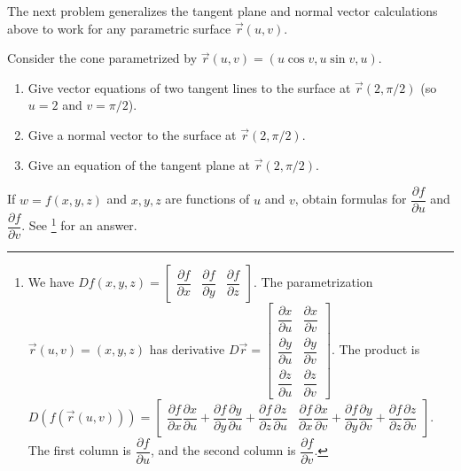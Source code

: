 The next problem generalizes the tangent plane and normal vector calculations above to work for any parametric surface $\vec r(u,v)$.
\begin{problem}[Day 3]%

%
 Consider the cone parametrized by $\vec r(u,v)=(u\cos v, u\sin v,u)$.
 \begin{enumerate}
 \item Give vector equations of two tangent lines to the surface at $\vec r(2,\pi/2)$ (so $u=2$ and $v=\pi/2$).
 \item Give a normal vector to the surface at $\vec r(2,\pi/2)$.
 \item Give an equation of the tangent plane at $\vec r(2,\pi/2)$.
 \end{enumerate}
\end{problem}

\newpage

\begin{review*}[Day 5]
 If $w=f(x,y,z)$ and $x,y,z$ are functions of $u$ and $v$, obtain formulas for $\dfrac{\partial f}{\partial u}$ and $\dfrac{\partial f}{\partial v}$.  See \footnote{
We have 
$Df(x,y,z)
=\begin{bmatrix}\dfrac{\partial f}{\partial x}&\dfrac{\partial f}{\partial y}&\dfrac{\partial f}{\partial z}\end{bmatrix}$. 
The parametrization $\vec r(u,v)=(x,y,z)$ has derivative 
$D\vec r 
=\begin{bmatrix}
\dfrac{\partial x}{\partial u}&\dfrac{\partial x}{\partial v}\\
\dfrac{\partial y}{\partial u}&\dfrac{\partial y}{\partial v}\\
\dfrac{\partial z}{\partial u}&\dfrac{\partial z}{\partial v}
\end{bmatrix}$. 
The product is
$D(f(\vec r(u,v)))
=\begin{bmatrix}
\dfrac{\partial f}{\partial x}\dfrac{\partial x}{\partial u}+
\dfrac{\partial f}{\partial y}\dfrac{\partial y}{\partial u}+
\dfrac{\partial f}{\partial z}\dfrac{\partial z}{\partial u}&
\dfrac{\partial f}{\partial x}\dfrac{\partial x}{\partial v}+
\dfrac{\partial f}{\partial y}\dfrac{\partial y}{\partial v}+
\dfrac{\partial f}{\partial z}\dfrac{\partial z}{\partial v}
\end{bmatrix}
$. The first column is $\dfrac{\partial f}{\partial u}$, and the second column is $\dfrac{\partial f}{\partial v}$.
} for an answer. 
\end{review*}

